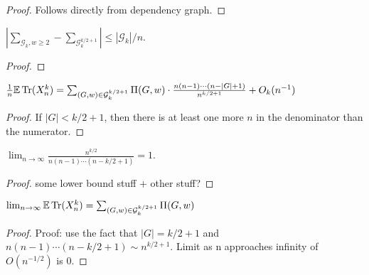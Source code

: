\begin{proof}
  \notready
  Follows directly from dependency graph.
\end{proof}
\fi



\begin{proposition}
  \label{prop:g_difference_bound}
  \notready
  $|\sum_{\mathcal{G}_{k}, w \ge 2} - \sum_{\mathcal{G}_k^{k/2+1}}| \le |\mathcal{G}_k|/n$.
\end{proposition}

\begin{proof}
  \notready
\end{proof}



\begin{proposition}%
  \label{prop:trace_ev_special_g}
  \notready
  $\frac1n\mathbb{E}\operatorname{Tr}(X_n^k) = \sum_{(G,w)\in\mathcal{G}^{k/2+1}_k} \Pi(G,w) \cdot \frac{n(n-1)\cdots(n-|G|+1)}{n^{k/2+1}} + O_k(n^{-1})$
\end{proposition}

\begin{proof}
  \notready
  If $|G| < k/2 + 1$, then there is at least one more $n$ in the denominator than the numerator.
\end{proof}

\begin{proposition}
  \label{lemma:fraction_limit_one}
  \notready
  $\lim_{n\to\infty}\frac{n^{k/2}}{n(n-1)\cdots(n-k/2+1)} = 1$.
\end{proposition}

\begin{proof}
  \notready
  some lower bound stuff + other stuff?
\end{proof}


\begin{proposition}
  \label{prop:trace_ev_limit_equals_sum}
  \notready
  $\lim_{n\to\infty}\mathbb{E}\operatorname{Tr}(X_n^k) = \sum_{(G,w)\in\mathcal{G}^{k/2+1}_k} \Pi(G,w)$
\end{proposition}

\begin{proof}
  \notready
  Proof: use the fact that $|G|=k/2+1$ and $n(n-1)\cdots(n-k/2+1) \sim n^{k/2+1}$. Limit as n approaches infinity of $O(n^{-1/2})$ is 0.
\end{proof}


